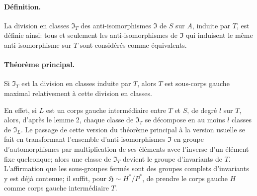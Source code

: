\paragraph{Définition.}
La division en classes \(\mathfrak I_T\) des anti-isomorphismes \(\mathfrak I\) de \(S\) sur \(A\), induite par \(T\), est définie ainsi: tous et seulement les anti-isomorphismes de \(\mathfrak I\) qui induisent le même anti-isomorphisme sur \(T\) sont considérés comme équivalents.

\paragraph{Théorème principal.}
Si \(\mathfrak I_T\) est la division en classes induite par \(T\), alors \(T\) est sous-corps gauche maximal relativement à cette division en classes.

En effet, si \(L\) est un corps gauche intermédiaire entre \(T\) et \(S\), de degré \(l\) sur \(T\), alors, d'après le lemme 2, chaque classe de \(\mathfrak I_T\) se décompose en au moins \(l\) classes de \(\mathfrak I_L\). Le passage de cette version du théorème principal à la version usuelle se fait en transformant l'ensemble d'anti-isomorphismes \(\mathfrak I\) en groupe d'automorphismes par multiplication de ses éléments avec l'inverse d'un élément fixe quelconque; alors une classe de \(\mathfrak I_T\) devient le groupe d'invariants de \(T\). L'affirmation que les sous-groupes fermés sont des groupes complets d'invariants y est déjà contenue; il suffit, pour \(\mathfrak H\sim H^*/P^*\), de prendre le corps gauche \(H\) comme corps gauche intermédiaire \(T\).

\clearpage
